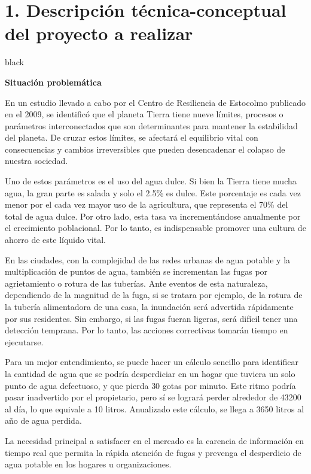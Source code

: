 \documentclass[
11pt, %
codirector, %
]{charter}
\begin{document}
\section{1. Descripción técnica-conceptual del proyecto a realizar}
\label{sec:descripcion}


\begin{consigna}{black} %

\textbf{Situación problemática} 

En un estudio llevado a cabo por el Centro de Resiliencia de Estocolmo publicado en el 2009, se identificó que el planeta Tierra tiene nueve límites, procesos o parámetros interconectados que son determinantes para mantener la estabilidad del planeta. De cruzar estos límites, se afectará el equilibrio vital con consecuencias y cambios irreversibles que pueden desencadenar el colapso de nuestra sociedad.

Uno de estos parámetros es el uso del agua dulce. Si bien la Tierra tiene mucha agua, la gran parte es salada y solo el 2.5\% es dulce. Este porcentaje es cada vez menor por el cada vez mayor uso de la agricultura, que representa el 70\% del total de agua dulce. Por otro lado, esta tasa va incrementándose anualmente por el crecimiento poblacional. Por lo tanto, es indispensable promover una cultura de ahorro de este líquido vital.

En las ciudades, con la complejidad de las redes urbanas de agua potable y la multiplicación de puntos de agua, también se incrementan las fugas por agrietamiento o rotura de las tuberías. Ante eventos de esta naturaleza, dependiendo de la magnitud de la fuga, si se tratara por ejemplo, de la rotura de la tubería alimentadora de una casa, la inundación será advertida rápidamente por sus residentes. Sin embargo, si las fugas fueran ligeras, será difícil tener una detección temprana. Por lo tanto, las acciones correctivas tomarán tiempo en ejecutarse.

Para un mejor entendimiento, se puede hacer un cálculo sencillo para identificar la cantidad de agua que se podría desperdiciar en un hogar que tuviera un solo punto de agua defectuoso, y que pierda 30 gotas por minuto. Este ritmo podría pasar inadvertido por el propietario, pero sí se logrará perder alrededor de 43200 al día, lo que equivale a 10 litros. Anualizado este cálculo, se llega a 3650 litros al año de agua perdida.

La necesidad principal a satisfacer en el mercado es la carencia de información en tiempo real que permita la rápida atención de fugas y prevenga el desperdicio de agua potable en los hogares u organizaciones.



\end{consigna}
\end{document}
